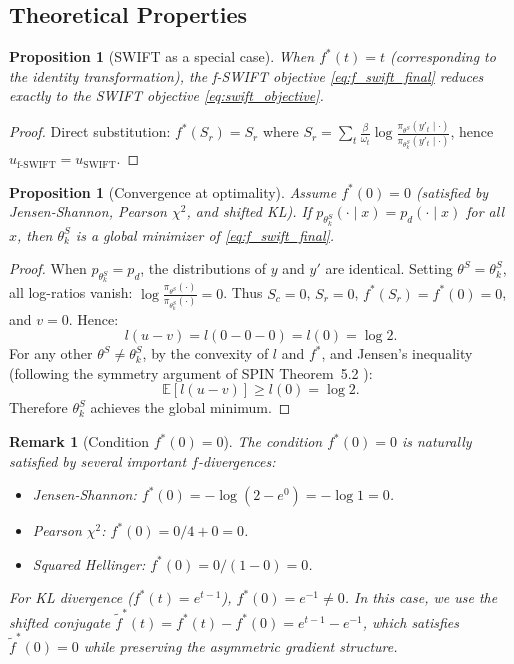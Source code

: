 \documentclass[11pt,a4paper]{article}
\newtheorem{proposition}[theorem]{Proposition}
\newtheorem{remark}[theorem]{Remark}
\newcommand{\E}{\mathbb{E}}
\begin{document}
\subsection{Theoretical Properties}
\label{subsec:theory}

\begin{proposition}[SWIFT as a special case]
\label{prop:swift_special}
When $f^*(t) = t$ (corresponding to the identity transformation), the f-SWIFT objective \eqref{eq:f_swift_final} reduces exactly to the SWIFT objective \eqref{eq:swift_objective}.
\end{proposition}

\begin{proof}
Direct substitution: $f^*(S_r) = S_r$ where $S_r = \sum_t \frac{\beta}{\omega_t} \log \frac{\pi_{\theta^S}(y'_t \mid \cdot)}{\pi_{\theta^S_k}(y'_t \mid \cdot)}$, hence $u_{\text{f-SWIFT}} = u_{\text{SWIFT}}$.
\end{proof}

\begin{proposition}[Convergence at optimality]
\label{prop:convergence}
Assume $f^*(0) = 0$ (satisfied by Jensen-Shannon, Pearson $\chi^2$, and shifted KL). If $p_{\theta^S_k}(\cdot \mid x) = p_d(\cdot \mid x)$ for all $x$, then $\theta^S_k$ is a global minimizer of \eqref{eq:f_swift_final}.
\end{proposition}

\begin{proof}
When $p_{\theta^S_k} = p_d$, the distributions of $y$ and $y'$ are identical. Setting $\theta^S = \theta^S_k$, all log-ratios vanish: $\log \frac{\pi_{\theta^S}(\cdot)}{\pi_{\theta^S_k}(\cdot)} = 0$. Thus $S_c = 0$, $S_r = 0$, $f^*(S_r) = f^*(0) = 0$, and $v = 0$. Hence:
\[
    l(u - v) = l(0 - 0 - 0) = l(0) = \log 2.
\]
For any other $\theta^S \neq \theta^S_k$, by the convexity of $l$ and $f^*$, and Jensen's inequality (following the symmetry argument of SPIN Theorem~5.2 \cite{chen2024spin}):
\[
    \E[l(u - v)] \geq l(0) = \log 2.
\]
Therefore $\theta^S_k$ achieves the global minimum.
\end{proof}

\begin{remark}[Condition $f^*(0) = 0$]
\label{rem:fstar_zero}
The condition $f^*(0) = 0$ is naturally satisfied by several important $f$-divergences:
\begin{itemize}[nosep]
    \item Jensen-Shannon: $f^*(0) = -\log(2 - e^0) = -\log 1 = 0$. \checkmark
    \item Pearson $\chi^2$: $f^*(0) = 0/4 + 0 = 0$. \checkmark
    \item Squared Hellinger: $f^*(0) = 0/(1-0) = 0$. \checkmark
\end{itemize}
For KL divergence ($f^*(t) = e^{t-1}$), $f^*(0) = e^{-1} \neq 0$. In this case, we use the \emph{shifted conjugate} $\tilde{f}^*(t) = f^*(t) - f^*(0) = e^{t-1} - e^{-1}$, which satisfies $\tilde{f}^*(0) = 0$ while preserving the asymmetric gradient structure.
\end{remark}
\end{document}
